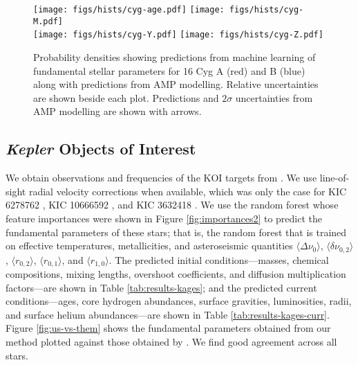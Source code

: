 \documentclass[twocolumn,twocolappendix]{aastex6}
\newif\ifref
\newcommand{\mb}[1]{\ifref\boldmath\textbf{#1}\unboldmath\else #1\fi}
\begin{document}
\begin{figure*}
    \centering
    \texttt{[image: figs/hists/cyg-age.pdf]}\hfill
    \texttt{[image: figs/hists/cyg-M.pdf]}\\
    \texttt{[image: figs/hists/cyg-Y.pdf]}\hfill
    \texttt{[image: figs/hists/cyg-Z.pdf]}
    \caption{Probability densities showing predictions from machine learning of fundamental stellar parameters for 16 Cyg A (red) and B (blue) \mb{along with} predictions from AMP modelling. Relative uncertainties are shown beside each plot. Predictions and $2\sigma$ uncertainties from AMP modelling are shown with arrows. \vspace*{5mm}
    \label{fig:16Cyg-hist}}
\end{figure*}


\subsection{\emph{Kepler} Objects of Interest}
\label{sec:koi}
We obtain observations and frequencies of the KOI targets from \citet{2016MNRAS.456.2183D}. We use line-of-sight radial velocity corrections when available, which was only the case for KIC 6278762 \citep{2002AJ....124.1144L}, KIC 10666592 \citep{2013A&A...554A..84M}, and KIC 3632418 \citep{2006AstL...32..759G}. We use the random forest whose feature importances were shown in Figure \ref{fig:importances2} to predict the fundamental \mb{parameters} of these stars; that is, the random forest that is trained on effective temperatures, metallicities, and asteroseismic quantities $\langle \Delta\nu_0 \rangle$, $\langle \delta\nu_{0,2} \rangle$, $\langle r_{0,2} \rangle$, $\langle r_{0,1} \rangle$, and $\langle r_{1,0} \rangle$. The predicted initial conditions---masses, chemical compositions, mixing lengths, overshoot coefficients, and diffusion \mb{multiplication} factors---are shown in Table \ref{tab:results-kages}; and the predicted current conditions---ages, core hydrogen abundances, surface gravities, luminosities, radii, and surface helium abundances---are shown in Table \ref{tab:results-kages-curr}. Figure \ref{fig:us-vs-them} shows the fundamental parameters obtained from our method plotted against those obtained by \citet[hereinafter KAGES]{2015MNRAS.452.2127S}. We find good agreement across all stars. 
\end{document}
